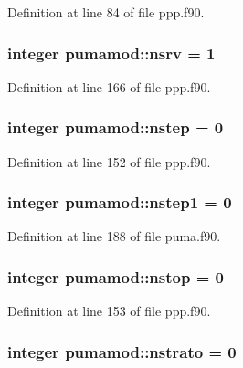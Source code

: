 \-Definition at line 84 of file ppp.\-f90.

\hypertarget{classpumamod_aca88948c25a082cc21503423423a9cad}{
\subsubsection[{nsrv}]{\setlength{\rightskip}{0pt plus 5cm}integer {\bf pumamod\-::nsrv} = 1}}
\label{classpumamod_aca88948c25a082cc21503423423a9cad}


\-Definition at line 166 of file ppp.\-f90.

\hypertarget{classpumamod_a856ad9c4756a0ccbf7fd325b06f1f900}{
\subsubsection[{nstep}]{\setlength{\rightskip}{0pt plus 5cm}integer {\bf pumamod\-::nstep} = 0}}
\label{classpumamod_a856ad9c4756a0ccbf7fd325b06f1f900}


\-Definition at line 152 of file ppp.\-f90.

\hypertarget{classpumamod_a44f4e89edb1112fb56a0acd8fe2de68c}{
\subsubsection[{nstep1}]{\setlength{\rightskip}{0pt plus 5cm}integer {\bf pumamod\-::nstep1} = 0}}
\label{classpumamod_a44f4e89edb1112fb56a0acd8fe2de68c}


\-Definition at line 188 of file puma.\-f90.

\hypertarget{classpumamod_a01f12039746034a94bf226982a6d64ee}{
\subsubsection[{nstop}]{\setlength{\rightskip}{0pt plus 5cm}integer {\bf pumamod\-::nstop} = 0}}
\label{classpumamod_a01f12039746034a94bf226982a6d64ee}


\-Definition at line 153 of file ppp.\-f90.

\hypertarget{classpumamod_a4e187fd01cc77d813b423d7fb921252d}{
\subsubsection[{nstrato}]{\setlength{\rightskip}{0pt plus 5cm}integer {\bf pumamod\-::nstrato} = 0}}
\label{classpumamod_a4e187fd01cc77d813b423d7fb921252d}


